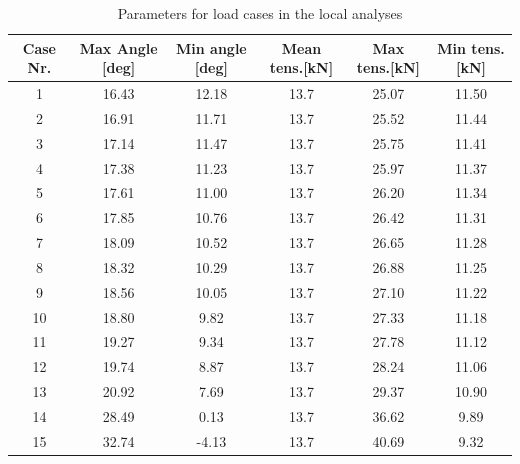 \begin{table} [H]
\centering
\begin{tabular}{ |c|c|c|c|c|c|}
\hline
    Case Nr. & Max Angle [deg] & Min angle [deg] & Mean tens.[kN] & Max tens.[kN]  & Min tens.[kN]   \\
 \hline
 \hline
    1 & 16.43 & 12.18 & 13.7 & 25.07 & 11.50   \\ 
    2 &  16.91 & 11.71 & 13.7 & 25.52 & 11.44   \\
    3 &  17.14 & 11.47 & 13.7 & 25.75 & 11.41   \\ 
    4 &  17.38 & 11.23 & 13.7 & 25.97 & 11.37  \\ 
    5 &  17.61 & 11.00 & 13.7 & 26.20 & 11.34  \\ 
    6 &  17.85 & 10.76 & 13.7 & 26.42 & 11.31  \\ 
    7 &  18.09 & 10.52 & 13.7 & 26.65 & 11.28   \\ 
    8 &  18.32 & 10.29 & 13.7 & 26.88 & 11.25  \\ 
    9 &  18.56 & 10.05 & 13.7 & 27.10 & 11.22  \\ 
    10 &  18.80 & 9.82 & 13.7 & 27.33 & 11.18  \\ 
    11 & 19.27 & 9.34 & 13.7 & 27.78 & 11.12  \\ 
    12 &  19.74 & 8.87 & 13.7 & 28.24 & 11.06  \\ 
    13 &  20.92 & 7.69 & 13.7 & 29.37 & 10.90  \\ 
    14 &  28.49 & 0.13 & 13.7 & 36.62 & 9.89  \\ 
    15 &  32.74 & -4.13 & 13.7 & 40.69 & 9.32 \\ 
 \hline
\end{tabular}
\caption{Parameters for load cases in the local analyses}
\label{table:loadcase}
\end{table} 

